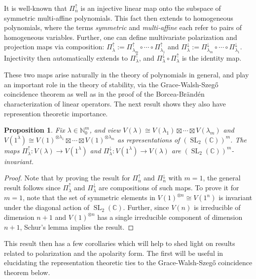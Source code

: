 \documentclass{article}
\newtheorem{proposition}[theorem]{Proposition}
\theoremstyle{definition}
\theoremstyle{plain}
\newcommand{\C}{\mathbb{C}}
\newcommand{\N}{\mathbb{N}}
\DeclareMathOperator{\SL}{SL}
\begin{document}
It is well-known that $\Pi_n^\uparrow$ is an injective linear map onto the subspace of symmetric multi-affine polynomials. This fact then extends to homogeneous polynomials, where the terms \emph{symmetric} and \emph{multi-affine} each refer to pairs of homogeneous variables. Further, one can define multivariate polarization and projection maps via composition: $\Pi_\lambda^\uparrow := \Pi_{\lambda_m}^\uparrow \circ \cdots \circ \Pi_{\lambda_1}^\uparrow$ and $\Pi_\lambda^\downarrow := \Pi_{\lambda_m}^\downarrow \circ \cdots \circ \Pi_{\lambda_1}^\downarrow$. Injectivity then automatically extends to $\Pi_\lambda^\uparrow$, and $\Pi_\lambda^\downarrow \circ \Pi_\lambda^\uparrow$ is the identity map.

These two maps arise naturally in the theory of polynomials in general, and play an important role in the theory of stability, via the Grace-Walsh-Szeg{\H{o}} coincidence theorem as well as in the proof of the Borcea-Br{\"a}nd{\'e}n characterization of linear operators. The next result shows they also have represention theoretic importance.

\begin{proposition}\label{pol_proj_inv_prop}
    Fix $\lambda \in \N_0^m$, and view $V(\lambda) \cong V(\lambda_1) \boxtimes \cdots \boxtimes V(\lambda_m)$ and $V(1^\lambda) \cong V(1)^{\otimes \lambda_1} \boxtimes \cdots \boxtimes V(1)^{\otimes \lambda_m}$ as representations of $(\SL_2(\C))^m$. The maps $\Pi_\lambda^\uparrow: V(\lambda) \rightarrow V(1^\lambda)$ and $\Pi_\lambda^\downarrow: V(1^\lambda) \rightarrow V(\lambda)$ are $(\SL_2(\C))^m$-invariant.
\end{proposition}
\begin{proof}
    Note that by proving the result for $\Pi_n^\uparrow$ and $\Pi_n^\downarrow$ with $m=1$, the general result follows since $\Pi_\lambda^\uparrow$ and $\Pi_\lambda^\downarrow$ are compositions of such maps. To prove it for $m=1$, note that the set of symmetric elements in $V(1)^{\otimes n} \cong V(1^n)$ is invariant under the diagonal action of $\SL_2(\C)$. Further, since $V(n)$ is irreducible of dimension $n+1$ and $V(1)^{\otimes n}$ has a single irreducible component of dimension $n+1$, Schur's lemma implies the result.
\end{proof}

This result then has a few corollaries which will help to shed light on results related to polarization and the apolarity form. The first will be useful in elucidating the representation theoretic ties to the Grace-Walsh-Szeg{\H{o}} coincidence theorem below.
\end{document}
